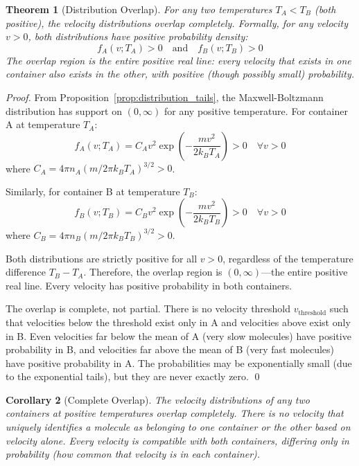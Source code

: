 \documentclass[12pt,a4paper]{article}
\newtheorem{theorem}{Theorem}[section]
\newtheorem{corollary}[theorem]{Corollary}
\theoremstyle{definition}
\theoremstyle{remark}
\begin{document}
\begin{theorem}[Distribution Overlap]
\label{thm:distribution_overlap}
For any two temperatures $T_A < T_B$ (both positive), the velocity distributions overlap completely. Formally, for any velocity $v > 0$, both distributions have positive probability density:
\begin{equation}
f_A(v; T_A) > 0 \quad \text{and} \quad f_B(v; T_B) > 0
\label{eq:complete_overlap}
\end{equation}
The overlap region is the entire positive real line: every velocity that exists in one container also exists in the other, with positive (though possibly small) probability.
\end{theorem}

\begin{proof}
From Proposition~\ref{prop:distribution_tails}, the Maxwell-Boltzmann distribution has support on $(0, \infty)$ for any positive temperature. For container A at temperature $T_A$:
\begin{equation}
f_A(v; T_A) = C_A v^2 \exp\left(-\frac{mv^2}{2k_B T_A}\right) > 0 \quad \forall v > 0
\end{equation}
where $C_A = 4\pi n_A (m / 2\pi k_B T_A)^{3/2} > 0$.

Similarly, for container B at temperature $T_B$:
\begin{equation}
f_B(v; T_B) = C_B v^2 \exp\left(-\frac{mv^2}{2k_B T_B}\right) > 0 \quad \forall v > 0
\end{equation}
where $C_B = 4\pi n_B (m / 2\pi k_B T_B)^{3/2} > 0$.

Both distributions are strictly positive for all $v > 0$, regardless of the temperature difference $T_B - T_A$. Therefore, the overlap region is $(0, \infty)$—the entire positive real line. Every velocity has positive probability in both containers.

The overlap is complete, not partial. There is no velocity threshold $v_{\text{threshold}}$ such that velocities below the threshold exist only in A and velocities above exist only in B. Even velocities far below the mean of A (very slow molecules) have positive probability in B, and velocities far above the mean of B (very fast molecules) have positive probability in A. The probabilities may be exponentially small (due to the exponential tails), but they are never exactly zero. \qed
\end{proof}

\begin{corollary}[Complete Overlap]
\label{cor:complete_overlap}
The velocity distributions of any two containers at positive temperatures overlap completely. There is no velocity that uniquely identifies a molecule as belonging to one container or the other based on velocity alone. Every velocity is compatible with both containers, differing only in probability (how common that velocity is in each container).
\end{corollary}
\end{document}
